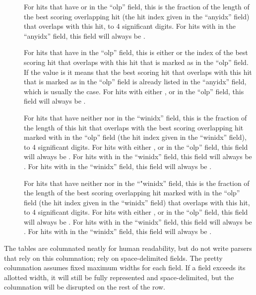 \begin{description}
\item[]
For hits that have \ccode{=} or \ccode{$} in the ``olp'' field, this is the
fraction of the length of the best scoring overlapping hit (the hit
index given in the ``anyidx'' field) that overlaps with this hit,
to 4 significant digits. 
For hits with \ccode{-} in the ``anyidx''
field, this field will always be \ccode{-}.  

\item[] 
For hits that have \ccode{=} in the ``olp'' field, this is either
 or the index of the best scoring hit that overlaps with this
hit that is marked as \ccode{\^} in the ``olp'' field. If the value
is  it means that the best scoring hit that overlaps with
this hit that is marked as \ccode{\^} in the ``olp'' field is
already listed in the ``anyidx'' field, which is usually the case.
For hits with either \ccode{*}, \ccode{\^} or \ccode{$} in the ``olp'' field,
this field will always be \ccode{-}.

\item[]
For hits that have neither \ccode{-} nor  in the
``winidx'' field, this is the fraction of the length of this hit
that overlaps with the best scoring overlapping hit marked with
\ccode{\^} in the ``olp'' field (the hit index given in the
``winidx'' field), to 4 significant digits.  For hits with either
\ccode{*}, \ccode{\^} or \ccode{$} in the ``olp'' field, this field will
always be \ccode{-}.  For hits with \ccode{-} in the ``winidx''
field, this field will always be \ccode{-}.  
For hits with  in the ``winidx''
field, this field will always be .  

\item[]
For hits that have neither \ccode{-} nor  in the
``"winidx'' field, this is the
fraction of the length of the best scoring overlapping hit marked with
\ccode{\^} in the ``olp'' field (the hit
index given in the ``winidx'' field) that overlaps with this hit,
to 4 significant digits. 
For hits with either 
\ccode{*}, \ccode{\^} or \ccode{$} in the ``olp'' field, this field will
always be \ccode{-}.  For hits with \ccode{-} in the ``winidx''
field, this field will always be \ccode{-}.  
For hits with  in the ``winidx''
field, this field will always be .  

\end{description}

The tables are columnated neatly for human readability, but do not
write parsers that rely on this columnation; rely on space-delimited
fields. The pretty columnation assumes fixed maximum widths for each
field. If a field exceeds its allotted width, it will still be fully
represented and space-delimited, but the columnation will be disrupted
on the rest of the row.

